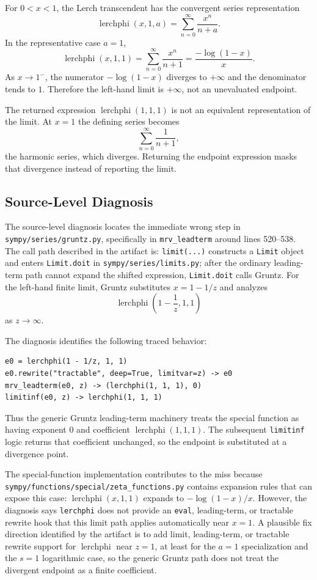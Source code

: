 \documentclass[11pt]{article}
\begin{document}
For \(0<x<1\), the Lerch transcendent has the convergent series representation
\[
\operatorname{lerchphi}(x,1,a)=\sum_{n=0}^{\infty}\frac{x^n}{n+a}.
\]
In the representative case \(a=1\),
\[
\operatorname{lerchphi}(x,1,1)
=\sum_{n=0}^{\infty}\frac{x^n}{n+1}
=\frac{-\log(1-x)}{x}.
\]
As \(x\to 1^-\), the numerator \(-\log(1-x)\) diverges to \(+\infty\) and the denominator tends to \(1\). Therefore the left-hand limit is \(+\infty\), not an unevaluated endpoint.

The returned expression \(\operatorname{lerchphi}(1,1,1)\) is not an equivalent representation of the limit. At \(x=1\) the defining series becomes
\[
\sum_{n=0}^{\infty}\frac{1}{n+1},
\]
the harmonic series, which diverges. Returning the endpoint expression masks that divergence instead of reporting the limit.

\subsection{Source-Level Diagnosis}

The source-level diagnosis locates the immediate wrong step in \nolinkurl{sympy/series/gruntz.py}, specifically in \texttt{mrv\_leadterm} around lines 520--538. The call path described in the artifact is: \texttt{limit(...)} constructs a \texttt{Limit} object and enters \texttt{Limit.doit} in \nolinkurl{sympy/series/limits.py}; after the ordinary leading-term path cannot expand the shifted expression, \texttt{Limit.doit} calls Gruntz. For the left-hand finite limit, Gruntz substitutes \(x=1-1/z\) and analyzes
\[
\operatorname{lerchphi}\left(1-\frac{1}{z},1,1\right)
\]
as \(z\to\infty\).

The diagnosis identifies the following traced behavior:

\begin{lstlisting}[style=bugpython]
e0 = lerchphi(1 - 1/z, 1, 1)
e0.rewrite("tractable", deep=True, limitvar=z) -> e0
mrv_leadterm(e0, z) -> (lerchphi(1, 1, 1), 0)
limitinf(e0, z) -> lerchphi(1, 1, 1)
\end{lstlisting}

Thus the generic Gruntz leading-term machinery treats the special function as having exponent \(0\) and coefficient \(\operatorname{lerchphi}(1,1,1)\). The subsequent \texttt{limitinf} logic returns that coefficient unchanged, so the endpoint is substituted at a divergence point.

\begin{sloppypar}
The special-function implementation contributes to the miss because \nolinkurl{sympy/functions/special/zeta_functions.py} contains expansion rules that can expose this case: \(\operatorname{lerchphi}(x,1,1)\) expands to \(-\log(1-x)/x\). However, the diagnosis says \texttt{lerchphi} does not provide an \texttt{eval}, leading-term, or tractable rewrite hook that this limit path applies automatically near \(x=1\). A plausible fix direction identified by the artifact is to add limit, leading-term, or tractable rewrite support for \(\operatorname{lerchphi}\) near \(z=1\), at least for the \(a=1\) specialization and the \(s=1\) logarithmic case, so the generic Gruntz path does not treat the divergent endpoint as a finite coefficient.
\end{sloppypar}
\end{document}
